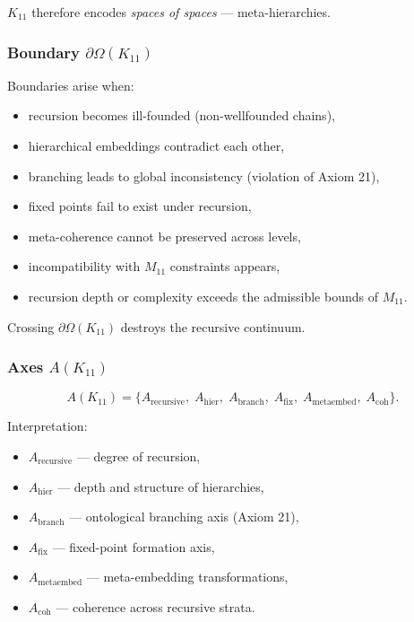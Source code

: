 $K_{11}$ therefore encodes \emph{spaces of spaces} — meta-hierarchies.

\subsubsection{Boundary $\partial\Omega(K_{11})$}

Boundaries arise when:
\begin{itemize}
    \item recursion becomes ill-founded (non-wellfounded chains),
    \item hierarchical embeddings contradict each other,
    \item branching leads to global inconsistency (violation of Axiom 21),
    \item fixed points fail to exist under recursion,
    \item meta-coherence cannot be preserved across levels,
    \item incompatibility with $M_{11}$ constraints appears,
    \item recursion depth or complexity exceeds the admissible bounds of $M_{11}$.
\end{itemize}

Crossing $\partial\Omega(K_{11})$ destroys the recursive continuum.

\subsubsection{Axes $A(K_{11})$}

\[
A(K_{11}) =
\{
A_{\mathrm{recursive}},\;
A_{\mathrm{hier}},\;
A_{\mathrm{branch}},\;
A_{\mathrm{fix}},\;
A_{\mathrm{metaembed}},\;
A_{\mathrm{coh}}
\}.
\]

Interpretation:
\begin{itemize}
    \item $A_{\mathrm{recursive}}$ — degree of recursion,
    \item $A_{\mathrm{hier}}$ — depth and structure of hierarchies,
    \item $A_{\mathrm{branch}}$ — ontological branching axis (Axiom 21),
    \item $A_{\mathrm{fix}}$ — fixed-point formation axis,
    \item $A_{\mathrm{metaembed}}$ — meta-embedding transformations,
    \item $A_{\mathrm{coh}}$ — coherence across recursive strata.
\end{itemize}

